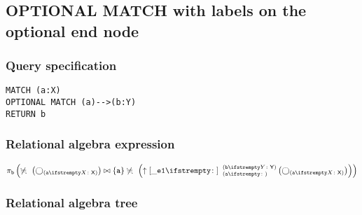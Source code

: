 
\subsection{OPTIONAL MATCH with labels on the optional end node}

\subsubsection*{Query specification}

\begin{lstlisting}
MATCH (a:X)
OPTIONAL MATCH (a)-->(b:Y)
RETURN b
\end{lstlisting}

\subsubsection*{Relational algebra expression}

$\projection{\var{b}} \left(\alldifferent{} \left(\getvertices{a}{X}\right) \join \{\var{a}\} \alldifferent{} \left(\expandout{\_e1}{}{a}{b}{Y} \left(\getvertices{a}{X}\right)\right)\right)$

\subsubsection*{Relational algebra tree}


